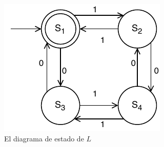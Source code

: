 \begin{figure}[H]
	\centering
	\includegraphics[width=0.4\linewidth]{doc/FiniteAutomaton/img/AFD}
	\caption{El diagrama de estado de $L$}
	\label{fig:AFD}
\end{figure}



